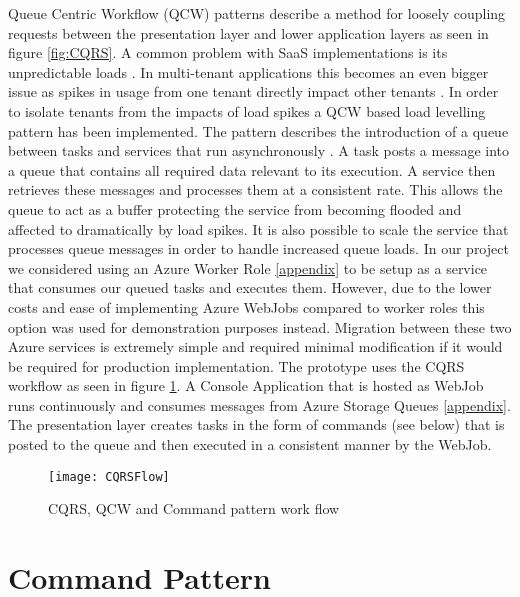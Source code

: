  Queue Centric Workflow (QCW) patterns describe a method for loosely coupling requests between the presentation layer and lower application layers as seen in figure \ref{fig:CQRS}. A common problem with SaaS implementations is its unpredictable loads \cite{Swanson}. In multi-tenant applications this becomes an even bigger issue as spikes in usage from one tenant directly impact other tenants \cite{Betts2012-ad}. In order to isolate tenants from the impacts of load spikes a QCW based load levelling pattern has been implemented. The pattern describes the introduction of a queue between tasks and services that run asynchronously \cite{Wilder2012-so}. A task posts a message into a queue that contains all required data relevant to its execution. A service then retrieves these messages and processes them at a consistent rate. This allows the queue to act as a buffer protecting the service from becoming flooded and affected to dramatically by load spikes.
It is also possible to scale the service that processes queue messages in order to handle increased queue loads. In our project we considered using an Azure Worker Role \ref{appendix} to be setup as a service that consumes our queued tasks and executes them. However, due to the lower costs and ease of implementing Azure WebJobs compared to worker roles this option was used for demonstration purposes instead. Migration between these two Azure services is extremely simple and required minimal modification if it would be required for production implementation. The prototype uses the CQRS workflow as seen in figure \ref{fig:CQRSFlow}. A Console Application that is hosted as WebJob runs continuously and consumes messages from Azure Storage Queues \ref{appendix}. The presentation layer creates tasks in the form of commands (see below) that is posted to the queue and then executed in a consistent manner by the WebJob.
 
\begin{figure}
\centering
\texttt{[image: CQRSFlow]}
\caption{CQRS, QCW and Command pattern work flow}
\label{fig:CQRSFlow}
\end{figure}
 
 
 \section{Command Pattern}
 
